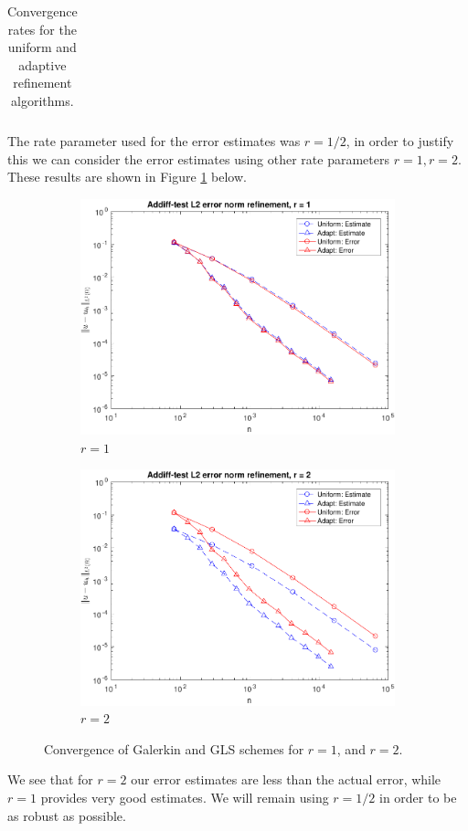 \documentclass{article}
\begin{document}
\begin{itemize}
\begin{table}[H]
\begin{tabular}{r||c|c}
		\end{tabular}
		\caption{Convergence rates for the uniform and adaptive refinement algorithms.}
		\label{tab:21}
	\end{table}
	The rate parameter used for the error estimates was \(r = 1/2\), in order to justify this we can consider the error estimates using other rate parameters \(r = 1, r = 2\). These results are shown in Figure \ref{fig:22} below.
	\begin{figure}[H]
		\centering
		\begin{subfigure}[b]{0.48\textwidth}
			\includegraphics[width=\textwidth]{addiff-test_adapt_r1.pdf}
			\caption{\(r = 1\)}
		\end{subfigure}
		\begin{subfigure}[b]{0.48\textwidth}
			\includegraphics[width=\textwidth]{addiff-test_adapt_r2.pdf}
			\caption{\(r = 2\)}
		\end{subfigure}
		\caption{Convergence of Galerkin and GLS schemes for \(r=1\), and \(r=2 \).}
		\label{fig:22}
	\end{figure}
	We see that for \(r = 2\) our error estimates are less than the actual error, while \(r = 1\) provides very good estimates. We will remain using \(r = 1/2\) in order to be as robust as possible. 



\end{itemize}
\end{document}
